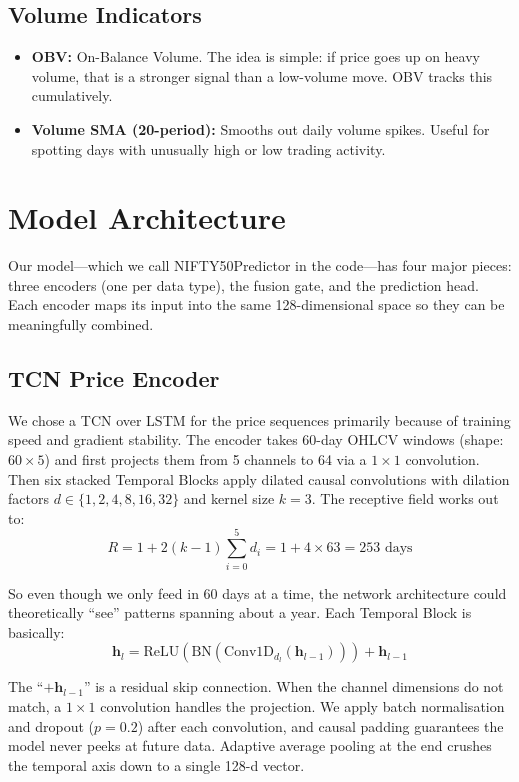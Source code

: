 \documentclass[conference]{IEEEtran}
\begin{document}
\subsection{Volume Indicators}
\begin{itemize}
\item \textbf{OBV:} On-Balance Volume. The idea is simple: if price goes up on heavy volume, that is a stronger signal than a low-volume move. OBV tracks this cumulatively.
\item \textbf{Volume SMA (20-period):} Smooths out daily volume spikes. Useful for spotting days with unusually high or low trading activity.
\end{itemize}

\section{Model Architecture}
Our model---which we call NIFTY50Predictor in the code---has four major pieces: three encoders (one per data type), the fusion gate, and the prediction head. Each encoder maps its input into the same 128-dimensional space so they can be meaningfully combined.

\subsection{TCN Price Encoder}
We chose a TCN over LSTM for the price sequences primarily because of training speed and gradient stability. The encoder takes 60-day OHLCV windows (shape: $60 \times 5$) and first projects them from 5 channels to 64 via a $1 \times 1$ convolution. Then six stacked Temporal Blocks apply dilated causal convolutions with dilation factors $d \in \{1, 2, 4, 8, 16, 32\}$ and kernel size $k = 3$. The receptive field works out to:
\begin{equation}
R = 1 + 2(k-1)\sum_{i=0}^{5} d_i = 1 + 4 \times 63 = 253 \text{ days}
\end{equation}

So even though we only feed in 60 days at a time, the network architecture could theoretically ``see'' patterns spanning about a year. Each Temporal Block is basically:
\begin{equation}
\mathbf{h}_l = \text{ReLU}\left(\text{BN}\left(\text{Conv1D}_{d_l}(\mathbf{h}_{l-1})\right)\right) + \mathbf{h}_{l-1}
\end{equation}

The ``$+ \mathbf{h}_{l-1}$'' is a residual skip connection. When the channel dimensions do not match, a $1 \times 1$ convolution handles the projection. We apply batch normalisation and dropout ($p = 0.2$) after each convolution, and causal padding guarantees the model never peeks at future data. Adaptive average pooling at the end crushes the temporal axis down to a single 128-d vector.
\end{document}
